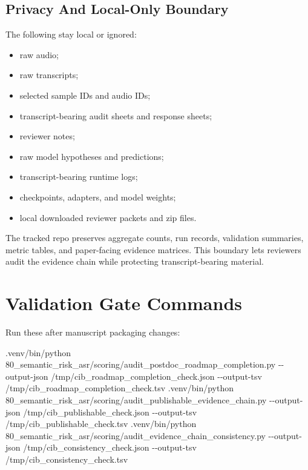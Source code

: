 \documentclass[
]{article}
\newenvironment{Shaded}{}{}
\newcommand{\AttributeTok}[1]{\textcolor[rgb]{0.49,0.56,0.16}{#1}}
\newcommand{\ExtensionTok}[1]{#1}
\newcommand{\NormalTok}[1]{#1}
\providecommand{\tightlist}{%
  \setlength{\itemsep}{0pt}\setlength{\parskip}{0pt}}
\begin{document}
\hypertarget{privacy-and-local-only-boundary}{%
\subsection{Privacy And Local-Only
Boundary}\label{privacy-and-local-only-boundary}}

The following stay local or ignored:

\begin{itemize}
\tightlist
\item
  raw audio;
\item
  raw transcripts;
\item
  selected sample IDs and audio IDs;
\item
  transcript-bearing audit sheets and response sheets;
\item
  reviewer notes;
\item
  raw model hypotheses and predictions;
\item
  transcript-bearing runtime logs;
\item
  checkpoints, adapters, and model weights;
\item
  local downloaded reviewer packets and zip files.
\end{itemize}

The tracked repo preserves aggregate counts, run records, validation
summaries, metric tables, and paper-facing evidence matrices. This
boundary lets reviewers audit the evidence chain while protecting
transcript-bearing material.

\hypertarget{validation-gate-commands}{%
\section{Validation Gate Commands}\label{validation-gate-commands}}

Run these after manuscript packaging changes:

\begin{Shaded}
\begin{Highlighting}[]
\ExtensionTok{.venv/bin/python}\NormalTok{ 80\_semantic\_risk\_asr/scoring/audit\_postdoc\_roadmap\_completion.py }\AttributeTok{{-}{-}output{-}json}\NormalTok{ /tmp/cib\_roadmap\_completion\_check.json }\AttributeTok{{-}{-}output{-}tsv}\NormalTok{ /tmp/cib\_roadmap\_completion\_check.tsv}
\ExtensionTok{.venv/bin/python}\NormalTok{ 80\_semantic\_risk\_asr/scoring/audit\_publishable\_evidence\_chain.py }\AttributeTok{{-}{-}output{-}json}\NormalTok{ /tmp/cib\_publishable\_check.json }\AttributeTok{{-}{-}output{-}tsv}\NormalTok{ /tmp/cib\_publishable\_check.tsv}
\ExtensionTok{.venv/bin/python}\NormalTok{ 80\_semantic\_risk\_asr/scoring/audit\_evidence\_chain\_consistency.py }\AttributeTok{{-}{-}output{-}json}\NormalTok{ /tmp/cib\_consistency\_check.json }\AttributeTok{{-}{-}output{-}tsv}\NormalTok{ /tmp/cib\_consistency\_check.tsv}
\end{Highlighting}
\end{Shaded}
\end{document}
